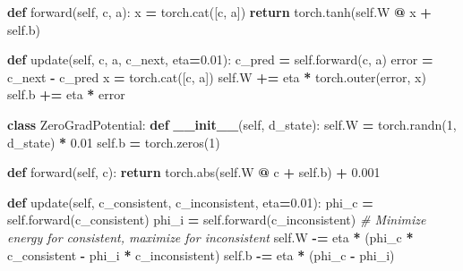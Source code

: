 \documentclass[
  11pt,
  a4paper,
]{article}
\newenvironment{Shaded}{\begin{snugshade}}{\end{snugshade}}
\newcommand{\BuiltInTok}[1]{#1}
\newcommand{\CommentTok}[1]{\textcolor[rgb]{0.56,0.35,0.01}{\textit{#1}}}
\newcommand{\ControlFlowTok}[1]{\textcolor[rgb]{0.13,0.29,0.53}{\textbf{#1}}}
\newcommand{\DecValTok}[1]{\textcolor[rgb]{0.00,0.00,0.81}{#1}}
\newcommand{\FloatTok}[1]{\textcolor[rgb]{0.00,0.00,0.81}{#1}}
\newcommand{\FunctionTok}[1]{\textcolor[rgb]{0.13,0.29,0.53}{\textbf{#1}}}
\newcommand{\KeywordTok}[1]{\textcolor[rgb]{0.13,0.29,0.53}{\textbf{#1}}}
\newcommand{\NormalTok}[1]{#1}
\newcommand{\OperatorTok}[1]{\textcolor[rgb]{0.81,0.36,0.00}{\textbf{#1}}}
\newcommand{\VariableTok}[1]{\textcolor[rgb]{0.00,0.00,0.00}{#1}}
\begin{document}
\begin{Shaded}
\begin{Highlighting}[]
    \KeywordTok{def}\NormalTok{ forward(}\VariableTok{self}\NormalTok{, c, a):}
\NormalTok{        x }\OperatorTok{=}\NormalTok{ torch.cat([c, a])}
        \ControlFlowTok{return}\NormalTok{ torch.tanh(}\VariableTok{self}\NormalTok{.W }\OperatorTok{@}\NormalTok{ x }\OperatorTok{+} \VariableTok{self}\NormalTok{.b)}
    
    \KeywordTok{def}\NormalTok{ update(}\VariableTok{self}\NormalTok{, c, a, c\_next, eta}\OperatorTok{=}\FloatTok{0.01}\NormalTok{):}
\NormalTok{        c\_pred }\OperatorTok{=} \VariableTok{self}\NormalTok{.forward(c, a)}
\NormalTok{        error }\OperatorTok{=}\NormalTok{ c\_next }\OperatorTok{{-}}\NormalTok{ c\_pred}
\NormalTok{        x }\OperatorTok{=}\NormalTok{ torch.cat([c, a])}
        \VariableTok{self}\NormalTok{.W }\OperatorTok{+=}\NormalTok{ eta }\OperatorTok{*}\NormalTok{ torch.outer(error, x)}
        \VariableTok{self}\NormalTok{.b }\OperatorTok{+=}\NormalTok{ eta }\OperatorTok{*}\NormalTok{ error}

\KeywordTok{class}\NormalTok{ ZeroGradPotential:}
    \KeywordTok{def} \FunctionTok{\_\_init\_\_}\NormalTok{(}\VariableTok{self}\NormalTok{, d\_state):}
        \VariableTok{self}\NormalTok{.W }\OperatorTok{=}\NormalTok{ torch.randn(}\DecValTok{1}\NormalTok{, d\_state) }\OperatorTok{*} \FloatTok{0.01}
        \VariableTok{self}\NormalTok{.b }\OperatorTok{=}\NormalTok{ torch.zeros(}\DecValTok{1}\NormalTok{)}
    
    \KeywordTok{def}\NormalTok{ forward(}\VariableTok{self}\NormalTok{, c):}
        \ControlFlowTok{return}\NormalTok{ torch.}\BuiltInTok{abs}\NormalTok{(}\VariableTok{self}\NormalTok{.W }\OperatorTok{@}\NormalTok{ c }\OperatorTok{+} \VariableTok{self}\NormalTok{.b) }\OperatorTok{+} \FloatTok{0.001}
    
    \KeywordTok{def}\NormalTok{ update(}\VariableTok{self}\NormalTok{, c\_consistent, c\_inconsistent, eta}\OperatorTok{=}\FloatTok{0.01}\NormalTok{):}
\NormalTok{        phi\_c }\OperatorTok{=} \VariableTok{self}\NormalTok{.forward(c\_consistent)}
\NormalTok{        phi\_i }\OperatorTok{=} \VariableTok{self}\NormalTok{.forward(c\_inconsistent)}
        \CommentTok{\# Minimize energy for consistent, maximize for inconsistent}
        \VariableTok{self}\NormalTok{.W }\OperatorTok{{-}=}\NormalTok{ eta }\OperatorTok{*}\NormalTok{ (phi\_c }\OperatorTok{*}\NormalTok{ c\_consistent }\OperatorTok{{-}}\NormalTok{ phi\_i }\OperatorTok{*}\NormalTok{ c\_inconsistent)}
        \VariableTok{self}\NormalTok{.b }\OperatorTok{{-}=}\NormalTok{ eta }\OperatorTok{*}\NormalTok{ (phi\_c }\OperatorTok{{-}}\NormalTok{ phi\_i)}
\end{Highlighting}
\end{Shaded}
\end{document}
